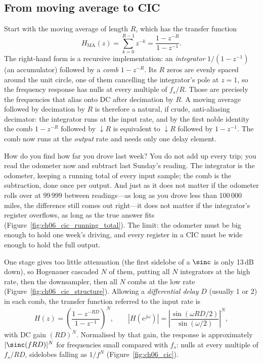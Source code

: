 \subsection{From moving average to CIC}

Start with the moving average of length $R$, which has the transfer function
\begin{equation}
H_{\text{MA}}(z)=\sum_{k=0}^{R-1}z^{-k}=\frac{1-z^{-R}}{1-z^{-1}}.
\label{eq:ch06:ma}
\end{equation}
The right-hand form is a recursive implementation: an \emph{integrator} $1/(1-z^{-1})$ (an
accumulator) followed by a \emph{comb} $1-z^{-R}$. Its $R$ zeros are evenly spaced around the unit
circle, one of them cancelling the integrator's pole at $z=1$, so the frequency response has nulls
at every multiple of $f_s/R$. Those are precisely the frequencies that alias onto DC after
decimation by $R$. A moving average followed by decimation by $R$ is therefore a natural, if
crude, anti-aliasing decimator: the integrator runs at the input rate, and by the first noble
identity the comb $1-z^{-R}$ followed by $\downarrow R$ is equivalent to $\downarrow R$ followed by
$1-z^{-1}$. The comb now runs at the \emph{output} rate and needs only one delay element.


\begin{analogy}
How do you find how far you drove last week? You do not add up every trip; you read the odometer
now and subtract last Sunday's reading. The integrator is the odometer, keeping a running total of
every input sample; the comb is the subtraction, done once per output. And just as it does not
matter if the odometer rolls over at 99\,999 between readings---as long as you drove less than
100\,000 miles, the difference still comes out right---it does not matter if the integrator's
register overflows, as long as the true answer fits (Figure~\ref{fig:ch06_cic_running_total}). The
limit: the odometer must be big enough to hold one week's driving, and every register in a CIC must
be wide enough to hold the full output.
\end{analogy}

One stage gives too little attenuation (the first sidelobe of a $\sinc$ is only 13\,dB down), so
Hogenauer cascaded $N$ of them, putting all $N$ integrators at the high rate, then the downsampler,
then all $N$ combs at the low rate (Figure~\ref{fig:ch06_cic_structure}). Allowing a
\emph{differential delay} $D$ (usually 1 or 2) in each comb, the transfer function referred to the
input rate is
\begin{equation}
H(z)=\left(\frac{1-z^{-RD}}{1-z^{-1}}\right)^N,\qquad
|H(e^{j\omega})|=\left|\frac{\sin(\omega RD/2)}{\sin(\omega/2)}\right|^N,
\label{eq:ch06:cic}
\end{equation}
with DC gain $(RD)^N$. Normalised by that gain, the response is approximately $|\sinc(fRD)|^N$
for frequencies small compared with $f_s$: nulls at every multiple of $f_s/RD$, sidelobes falling
as $1/f^N$ (Figure~\ref{fig:ch06_cic}).

